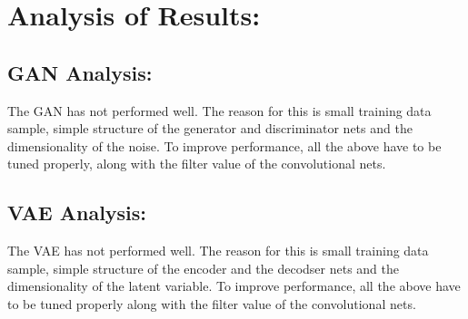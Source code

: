 \documentclass[11pt,usenames]{article}
\begin{document}
	\section{Analysis of Results:}\label{section:AnalysisResults}
	
	\subsection{GAN Analysis:}\label{subsection:GAN_Analysis}
	The GAN has not performed well. The reason for this is small training data sample, simple structure of the generator and discriminator nets and the dimensionality of the noise. To improve performance, all the above have to be tuned properly, along with the filter value of the convolutional nets.

	\subsection{VAE Analysis:}\label{subsection:VAE_Analysis}			
	The VAE has not performed well. The reason for this is small training data sample, simple structure of the encoder and the decodser nets and the dimensionality of the latent variable. To improve performance, all the above have to be tuned properly along with the filter value of the convolutional nets.	
		
	
\end{document}
